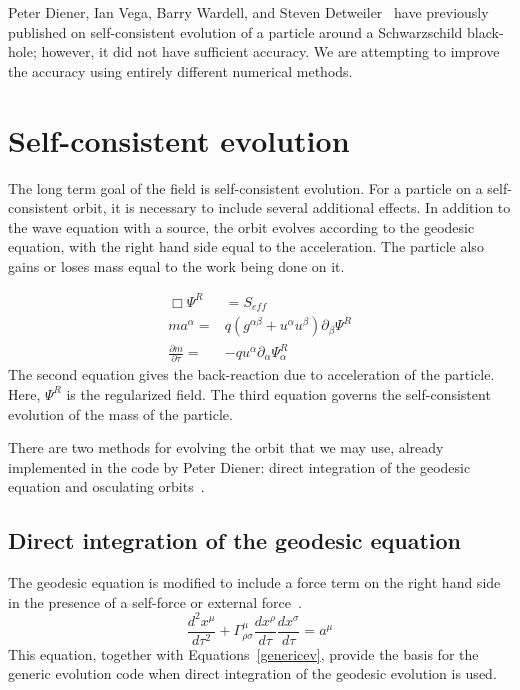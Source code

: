 Peter Diener, Ian Vega, Barry Wardell, and Steven Detweiler~\cite{diener_vega_wardell_detwieler_2012} have previously published on self-consistent evolution of a particle around a Schwarzschild black-hole; however, it did not have sufficient accuracy. We are attempting to improve the accuracy using entirely different numerical methods.

\section{Self-consistent evolution}



The long term goal of the field is self-consistent evolution. For a particle on a self-consistent orbit, it is necessary to include several additional effects. In addition to the wave equation with a source, the orbit evolves according to the geodesic equation, with the right hand side equal to the acceleration. The particle also gains or loses mass equal to the work being done on it. 

\begin{eqnarray}
  \Box\Psi^{R} &=S_{eff}\nonumber\\
    ma^\alpha=&q(g^{\alpha\beta}+u^\alpha u^\beta)\partial_\beta\Psi^{R}\nonumber\\
    \frac{\partial m}{\partial \tau}=&-q u^\alpha\partial_\alpha \Psi^R_\alpha
    \label{genericev}
\end{eqnarray}
The second equation gives the back-reaction due to acceleration of the particle. Here, $\Psi^R$ is the regularized field. The third equation governs the self-consistent evolution of the mass of the particle.~\cite{WardellSelfForceReview}

There are two methods for evolving the orbit that we may use, already implemented in the code by Peter Diener: direct integration of the geodesic equation and osculating orbits~\cite{pound_poisson}.

\subsection{Direct integration of the geodesic equation}
The geodesic equation is modified to include a force term on the right hand side in the presence of a self-force or external force~\cite{Carroll}.
\begin{equation}
  \frac{d^2x^\mu}{d\tau^2}+\Gamma^\mu_{\rho\sigma}\frac{dx^\rho}{d\tau}\frac{dx^\sigma}{d\tau}=a^\mu
\end{equation}
This equation, together with Equations~\ref{genericev}, provide the basis for the generic evolution code when direct integration of the geodesic evolution is used. 

